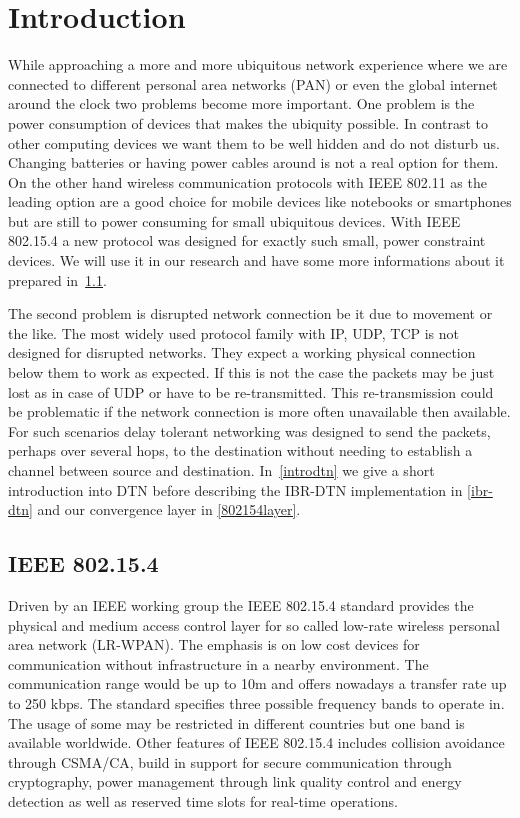 \chapter{Introduction}
While approaching a more and more ubiquitous network experience where we are
connected to different personal area networks (PAN) or even the global internet
around the clock two problems become more important. One problem is the power
consumption of devices that makes the ubiquity possible. In contrast to other
computing devices we want them to be well hidden and do not disturb us. Changing
batteries or having power cables around is not a real option for them. On the
other hand wireless communication protocols with IEEE 802.11 \cite{ieee80211} as the
leading option are a good choice for mobile devices like notebooks or
smartphones but are still to power consuming for small ubiquitous devices.
With IEEE 802.15.4 \cite{ieee802154} a new protocol was designed for exactly such
small, power constraint devices. We will use it in our research and have some
more informations about it prepared in~\ref{intro802154}.

The second problem is disrupted network connection be it due to movement or
the like. The most widely used protocol family with IP, UDP, TCP is not
designed for disrupted networks. They expect a working physical connection below
them to work as expected. If this is not the case the packets may be just lost
as in case of UDP or have to be re-transmitted. This re-transmission could be
problematic if the network connection is more often unavailable then available.
For such scenarios delay tolerant networking was designed to send the
packets, perhaps over several hops, to the destination without needing to
establish a channel between source and destination. In~\ref{introdtn} we give a
short introduction into DTN before describing the IBR-DTN implementation in
\ref{ibr-dtn} and our convergence layer in \ref{802154layer}.

\section{IEEE 802.15.4}
\label{intro802154}
Driven by an IEEE working group the IEEE 802.15.4 standard provides the physical and
medium access control layer for so called low-rate wireless personal area network
(LR-WPAN). The emphasis is on low cost devices for communication without
infrastructure in a nearby environment. The communication range would be up to
10m and offers nowadays a transfer rate up to 250 kbps. The standard specifies
three possible frequency bands to operate in. The usage of some may be
restricted in different countries but one band is available worldwide. Other
features of IEEE 802.15.4 includes collision avoidance through CSMA/CA, build in
support for secure communication through cryptography, power management through
link quality control and energy detection as well as reserved time slots for
real-time operations.


